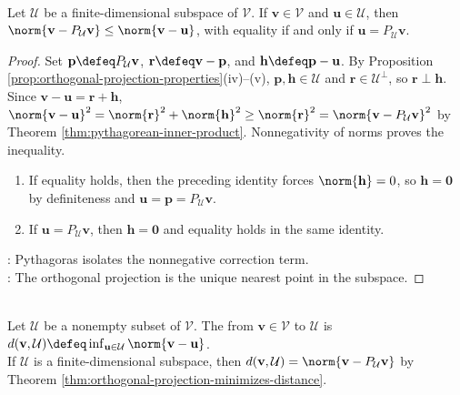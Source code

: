 \begin{theorem} \label{thm:orthogonal-projection-minimizes-distance} \\
Let $\mathcal{U}$ be a finite-dimensional subspace of $\mathcal{V}$. If $\mathbf{v}\in\mathcal{V}$ and $\mathbf{u}\in\mathcal{U}$, then $\norm{\mathbf{v}-P_{\mathcal{U}}\mathbf{v}}\leq\norm{\mathbf{v}-\mathbf{u}}$, with equality if and only if $\mathbf{u}=P_{\mathcal{U}}\mathbf{v}$.
\begin{proof}
Set $\mathbf{p}\defeq P_{\mathcal{U}}\mathbf{v}$, $\mathbf{r}\defeq\mathbf{v}-\mathbf{p}$, and $\mathbf{h}\defeq\mathbf{p}-\mathbf{u}$. By Proposition \ref{prop:orthogonal-projection-properties}(iv)--(v), $\mathbf{p},\mathbf{h}\in\mathcal{U}$ and $\mathbf{r}\in\mathcal{U}^{\perp}$, so $\mathbf{r}\perp\mathbf{h}$.\\
Since $\mathbf{v}-\mathbf{u}=\mathbf{r}+\mathbf{h}$, $\norm{\mathbf{v}-\mathbf{u}}^2=\norm{\mathbf{r}}^2+\norm{\mathbf{h}}^2\geq\norm{\mathbf{r}}^2=\norm{\mathbf{v}-P_{\mathcal{U}}\mathbf{v}}^2$ by Theorem \ref{thm:pythagorean-inner-product}. Nonnegativity of norms proves the inequality.
\begin{enumerate}[label=\roman*.]
\setlength{\itemsep}{0pt}
\item[$(\Rightarrow)$] If equality holds, then the preceding identity forces $\norm{\mathbf{h}}=0$, so $\mathbf{h}=\mathbf{0}$ by definiteness and $\mathbf{u}=\mathbf{p}=P_{\mathcal{U}}\mathbf{v}$. \item[$(\Leftarrow)$] If $\mathbf{u}=P_{\mathcal{U}}\mathbf{v}$, then $\mathbf{h}=\mathbf{0}$ and equality holds in the same identity.
\end{enumerate}
: Pythagoras isolates the nonnegative correction term.\\
: The orthogonal projection is the unique nearest point in the subspace.
\end{proof}
\end{theorem}

\begin{definition} \label{def:distance-to-subspace} \\
Let $\mathcal{U}$ be a nonempty subset of $\mathcal{V}$. The  from $\mathbf{v}\in\mathcal{V}$ to $\mathcal{U}$ is $d(\mathbf{v},\mathcal{U})\defeq\inf_{\mathbf{u}\in\mathcal{U}}\norm{\mathbf{v}-\mathbf{u}}$.\\
If $\mathcal{U}$ is a finite-dimensional subspace, then $d(\mathbf{v},\mathcal{U})=\norm{\mathbf{v}-P_{\mathcal{U}}\mathbf{v}}$ by Theorem \ref{thm:orthogonal-projection-minimizes-distance}.
\end{definition}

